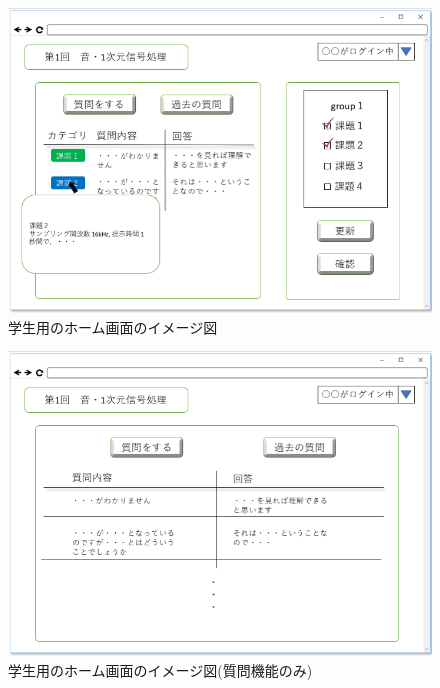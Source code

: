 \begin{figure}[phtbp]
  \begin{center}
    \includegraphics[width=1\linewidth,clip]{./img/28.png}
    \caption{学生用のホーム画面のイメージ図}\label{fig:28}
  \end{center}
\end{figure}

\begin{figure}[phtbp]
  \begin{center}
    \includegraphics[width=1\linewidth,clip]{./img/29.png}
    \caption{学生用のホーム画面のイメージ図(質問機能のみ)}\label{fig:29}
  \end{center}
\end{figure}

